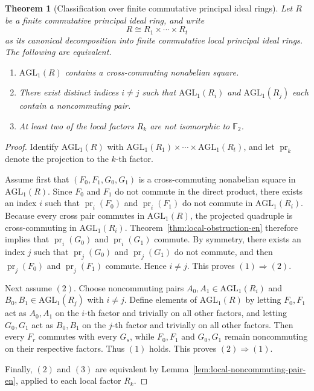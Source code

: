 \documentclass[11pt]{article}
\newcommand{\AGL}{\mathrm{AGL}_1}
\theoremstyle{uprightthm}
\newtheorem{theorem}{Theorem}[section]
\begin{document}
\begin{theorem}[Classification over finite commutative principal ideal rings]
\label{thm:pir-classification-en}
Let $R$ be a finite commutative principal ideal ring, and write
\[
R\cong R_1\times \cdots \times R_t
\]
as its canonical decomposition into finite commutative local principal ideal
rings. The following are equivalent.
\begin{enumerate}
\item $\AGL(R)$ contains a cross-commuting nonabelian square.
\item There exist distinct indices $i\ne j$ such that $\AGL(R_i)$ and
$\AGL(R_j)$ each contain a noncommuting pair.
\item At least two of the local factors $R_k$ are not isomorphic to
$\mathbb F_2$.
\end{enumerate}
\end{theorem}

\begin{proof}
Identify $\AGL(R)$ with $\AGL(R_1)\times\cdots\times \AGL(R_t)$, and let
$\operatorname{pr}_k$ denote the projection to the $k$-th factor.

Assume first that $(F_0,F_1,G_0,G_1)$ is a cross-commuting nonabelian square in
$\AGL(R)$. Since $F_0$ and $F_1$ do not commute in the direct product, there
exists an index $i$ such that $\operatorname{pr}_i(F_0)$ and
$\operatorname{pr}_i(F_1)$ do not commute in $\AGL(R_i)$. Because every cross
pair commutes in $\AGL(R)$, the projected quadruple is cross-commuting in
$\AGL(R_i)$. Theorem~\ref{thm:local-obstruction-en} therefore implies that
$\operatorname{pr}_i(G_0)$ and $\operatorname{pr}_i(G_1)$ commute. By symmetry,
there exists an index $j$ such that $\operatorname{pr}_j(G_0)$ and
$\operatorname{pr}_j(G_1)$ do not commute, and then
$\operatorname{pr}_j(F_0)$ and $\operatorname{pr}_j(F_1)$ commute. Hence
$i\ne j$. This proves $(1)\Rightarrow(2)$.

Next assume $(2)$. Choose noncommuting pairs
$A_0,A_1\in \AGL(R_i)$ and $B_0,B_1\in \AGL(R_j)$ with $i\ne j$. Define
elements of $\AGL(R)$ by letting $F_0,F_1$ act as $A_0,A_1$ on the $i$-th
factor and trivially on all other factors, and letting $G_0,G_1$ act as
$B_0,B_1$ on the $j$-th factor and trivially on all other factors. Then every
$F_r$ commutes with every $G_s$, while $F_0,F_1$ and $G_0,G_1$ remain
noncommuting on their respective factors. Thus $(1)$ holds. This proves
$(2)\Rightarrow(1)$.

Finally, $(2)$ and $(3)$ are equivalent by
Lemma~\ref{lem:local-noncommuting-pair-en}, applied to each local factor
$R_k$.
\end{proof}
\end{document}
